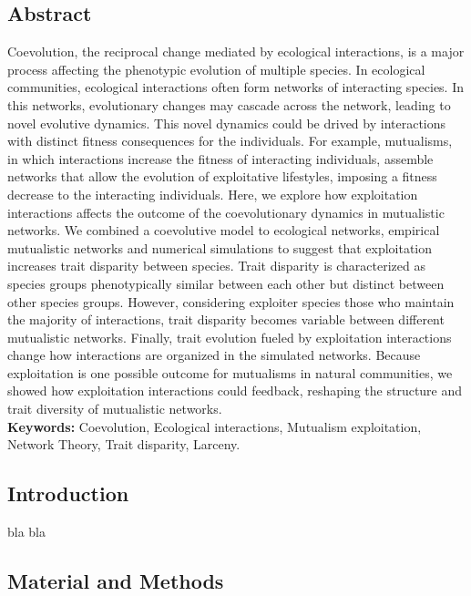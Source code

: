 \documentclass[a4paper, 12pt]{article}
\begin{document}
\subsection*{Abstract}
Coevolution, the reciprocal change mediated by ecological interactions, is a major process affecting the phenotypic evolution of multiple species. In ecological communities, ecological interactions often form networks of interacting species. In this networks, evolutionary changes may cascade across the network, leading to novel evolutive dynamics. This novel dynamics could be drived by interactions with distinct fitness consequences for the individuals. For example, mutualisms, in which interactions increase the fitness of interacting individuals, assemble networks that allow the evolution of exploitative lifestyles, imposing a fitness decrease to the interacting individuals. Here, we explore how exploitation interactions affects the outcome of the coevolutionary dynamics in mutualistic networks. We combined a coevolutive model to ecological networks, empirical mutualistic networks and numerical simulations to suggest that exploitation increases trait disparity between species. Trait disparity is characterized as species groups phenotypically similar between each other but distinct between other species groups. However, considering exploiter species those who maintain the majority of interactions, trait disparity becomes variable between different mutualistic networks. Finally, trait evolution fueled by exploitation interactions change how interactions are organized in the simulated networks. Because exploitation is one possible outcome for mutualisms in natural communities, we showed how exploitation interactions could feedback, reshaping the structure and trait diversity of mutualistic networks. \\
\textbf{Keywords:} Coevolution, Ecological interactions, Mutualism exploitation, Network Theory, Trait disparity, Larceny.
\newpage

\subsection*{Introduction}
bla bla

\subsection*{Material and Methods}
\end{document}
